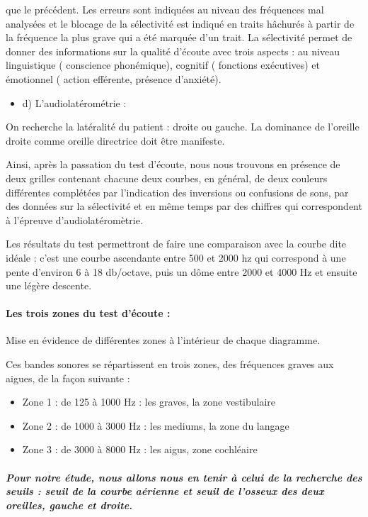 \documentclass[12pt,french]{report}
\begin{document}
que le précédent. Les erreurs sont indiquées au niveau des fréquences
mal analysées et le blocage de la sélectivité est indiqué en traits
hâchurés à partir de la fréquence la plus grave qui a été marquée
d'un trait. La sélectivité permet de donner des informations sur la
qualité d'écoute avec trois aspects : au niveau linguistique ( conscience
phonémique), cognitif ( fonctions exécutives) et émotionnel ( action
efférente, présence d'anxiété).
\begin{itemize}
\item d) L'audiolatérométrie : 
\end{itemize}
On recherche la latéralité du patient : droite ou gauche. La dominance
de l'oreille droite comme oreille directrice doit être manifeste.

Ainsi, après la passation du test d\textquoteright écoute, nous nous
trouvons en présence de deux grilles contenant chacune deux courbes,
en général, de deux couleurs différentes complétées par l'indication
des inversions ou confusions de sons, par des données sur la sélectivité
et en même temps par des chiffres qui correspondent à l'épreuve d'audiolatéromètrie.

Les résultats du test permettront de faire une comparaison avec la
courbe dite idéale : c'est une courbe ascendante entre 500 et 2000
hz qui correspond à une pente d\textquoteright environ 6 à 18 db/octave,
puis un dôme entre 2000 et 4000 Hz et ensuite une légère descente. 

\paragraph{Les trois zones du test d'écoute : }

Mise en évidence de différentes zones à l\textquoteright intérieur
de chaque diagramme. 

Ces bandes sonores se répartissent en trois zones, des fréquences
graves aux aigues, de la façon suivante :
\begin{itemize}
\item Zone 1 : de 125 à 1000 Hz : les graves, la zone vestibulaire
\item Zone 2 : de 1000 à 3000 Hz : les mediums, la zone du langage
\item Zone 3 : de 3000 à 8000 Hz : les aigus, zone cochléaire
\end{itemize}

\subparagraph*{Pour notre étude, nous allons nous en tenir à celui de la recherche
des seuils : seuil de la courbe aérienne et seuil de l'osseux des
deux oreilles, gauche et droite.}
\end{document}
